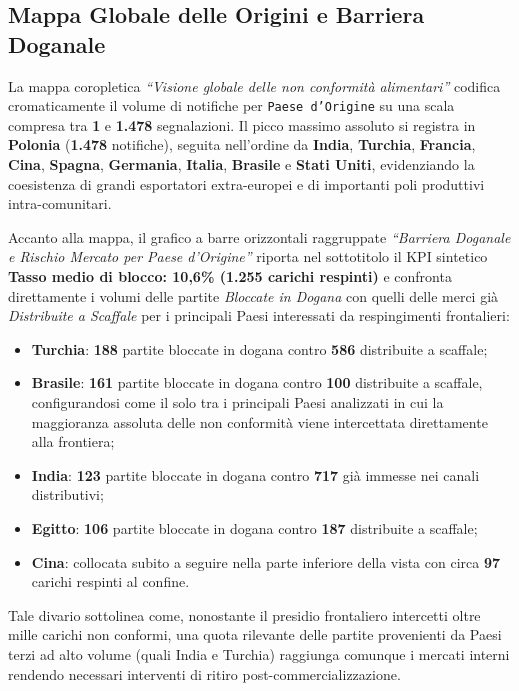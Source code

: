 \subsection{Mappa Globale delle Origini e Barriera Doganale}
La mappa coropletica \textit{``Visione globale delle non conformità alimentari''} codifica cromaticamente il volume di notifiche per \texttt{Paese d'Origine} su una scala compresa tra \textbf{1} e \textbf{1.478} segnalazioni. Il picco massimo assoluto si registra in \textbf{Polonia} (\textbf{1.478} notifiche), seguita nell'ordine da \textbf{India}, \textbf{Turchia}, \textbf{Francia}, \textbf{Cina}, \textbf{Spagna}, \textbf{Germania}, \textbf{Italia}, \textbf{Brasile} e \textbf{Stati Uniti}, evidenziando la coesistenza di grandi esportatori extra-europei e di importanti poli produttivi intra-comunitari.

Accanto alla mappa, il grafico a barre orizzontali raggruppate \textit{``Barriera Doganale e Rischio Mercato per Paese d'Origine''} riporta nel sottotitolo il KPI sintetico \textbf{Tasso medio di blocco: 10,6\% (1.255 carichi respinti)} e confronta direttamente i volumi delle partite \textit{Bloccate in Dogana} con quelli delle merci già \textit{Distribuite a Scaffale} per i principali Paesi interessati da respingimenti frontalieri:
\begin{itemize}
    \item \textbf{Turchia}: \textbf{188} partite bloccate in dogana contro \textbf{586} distribuite a scaffale;
    \item \textbf{Brasile}: \textbf{161} partite bloccate in dogana contro \textbf{100} distribuite a scaffale, configurandosi come il solo tra i principali Paesi analizzati in cui la maggioranza assoluta delle non conformità viene intercettata direttamente alla frontiera;
    \item \textbf{India}: \textbf{123} partite bloccate in dogana contro \textbf{717} già immesse nei canali distributivi;
    \item \textbf{Egitto}: \textbf{106} partite bloccate in dogana contro \textbf{187} distribuite a scaffale;
    \item \textbf{Cina}: collocata subito a seguire nella parte inferiore della vista con circa \textbf{97} carichi respinti al confine.
\end{itemize}
Tale divario sottolinea come, nonostante il presidio frontaliero intercetti oltre mille carichi non conformi, una quota rilevante delle partite provenienti da Paesi terzi ad alto volume (quali India e Turchia) raggiunga comunque i mercati interni rendendo necessari interventi di ritiro post-commercializzazione.

